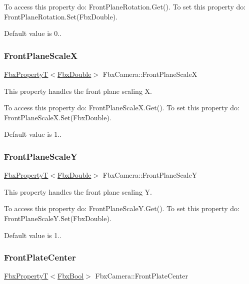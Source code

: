 To access this property do\+: Front\+Plane\+Rotation.\+Get(). To set this property do\+: Front\+Plane\+Rotation.\+Set(\+Fbx\+Double).

Default value is 0.. \mbox{\label{class_fbx_camera_a13396eaf60196ca60b78e3c05ee74021}} 
\subsubsection{\texorpdfstring{Front\+Plane\+ScaleX}{FrontPlaneScaleX}}
{\footnotesize\ttfamily \hyperlink{class_fbx_property_t}{Fbx\+PropertyT}$<$\hyperlink{fbxtypes_8h_a171e72a1c46fc15c1a6c9c31948c1c5b}{Fbx\+Double}$>$ Fbx\+Camera\+::\+Front\+Plane\+ScaleX}

This property handles the front plane scaling X.

To access this property do\+: Front\+Plane\+Scale\+X.\+Get(). To set this property do\+: Front\+Plane\+Scale\+X.\+Set(\+Fbx\+Double).

Default value is 1.. \mbox{\label{class_fbx_camera_a48072957694967921a9b9eccfadc6dce}} 
\subsubsection{\texorpdfstring{Front\+Plane\+ScaleY}{FrontPlaneScaleY}}
{\footnotesize\ttfamily \hyperlink{class_fbx_property_t}{Fbx\+PropertyT}$<$\hyperlink{fbxtypes_8h_a171e72a1c46fc15c1a6c9c31948c1c5b}{Fbx\+Double}$>$ Fbx\+Camera\+::\+Front\+Plane\+ScaleY}

This property handles the front plane scaling Y.

To access this property do\+: Front\+Plane\+Scale\+Y.\+Get(). To set this property do\+: Front\+Plane\+Scale\+Y.\+Set(\+Fbx\+Double).

Default value is 1.. \mbox{\label{class_fbx_camera_ae7a43caba31795438a1ca41926a8e31c}} 
\subsubsection{\texorpdfstring{Front\+Plate\+Center}{FrontPlateCenter}}
{\footnotesize\ttfamily \hyperlink{class_fbx_property_t}{Fbx\+PropertyT}$<$\hyperlink{fbxtypes_8h_a92e0562b2fe33e76a242f498b362262e}{Fbx\+Bool}$>$ Fbx\+Camera\+::\+Front\+Plate\+Center}

